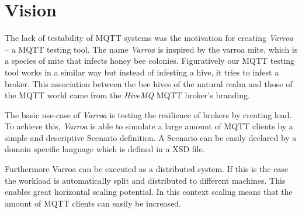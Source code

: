 \chapter{Vision}
The lack of testability of MQTT systems was the motivation for creating \emph{Varroa} -- a MQTT testing tool.
The name \emph{Varroa} is inspired by the varroa mite, which is a species of mite that infects honey bee colonies.
Figuratively our MQTT testing tool works in a similar way but instead of infesting a hive, it tries to infest a broker.
This association between the bee hives of the natural realm and those of the MQTT world came from the \emph{HiveMQ} MQTT broker's branding.


The basic use-case of \emph{Varroa} is testing the resilience of brokers by creating load.
To achieve this, \emph{Varroa} is able to simulate a large amount of MQTT clients by a simple and descriptive Scenario definition.
A Scenario can be easily declared by a domain specific language which is defined in a XSD file.


Furthermore Varroa can be executed as a distributed system.
If this is the case the workload is automatically split and distributed to different machines.
This enables great horizontal scaling potential.
In this context scaling means that the amount of MQTT clients can easily be increased.


